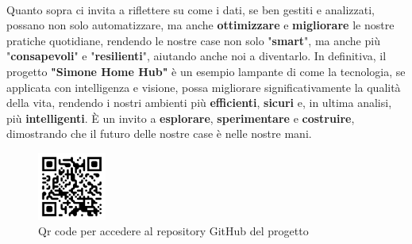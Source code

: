 \documentclass[11pt, a4paper]{article}
\begin{document}
\\
Quanto sopra ci invita a riflettere su come i dati, se ben gestiti e analizzati, possano 
non solo automatizzare, ma anche \textbf{ottimizzare} e \textbf{migliorare} le nostre pratiche quotidiane, rendendo le 
nostre case non solo "\textbf{smart}", ma anche più "\textbf{consapevoli}" e "\textbf{resilienti}", aiutando anche noi a diventarlo.
In definitiva, il progetto \textbf{"Simone Home Hub"} è un esempio lampante di come la tecnologia, se 
applicata con intelligenza e visione, possa migliorare significativamente la qualità della vita, 
rendendo i nostri ambienti più \textbf{efficienti}, \textbf{sicuri} e, in ultima analisi, più \textbf{intelligenti}. È un invito a 
\textbf{esplorare}, \textbf{sperimentare} e \textbf{costruire}, dimostrando che il futuro delle nostre case è nelle nostre mani.
\vfill
\begin{figure}[H]
    \centering
    \includegraphics[width=0.2\textwidth]{media/qr-code.png}
    \caption{Qr code per accedere al repository GitHub del progetto}
    \label{fig:simone-home-hub-qr-code}
\end{figure}
\vfill
\end{document}
